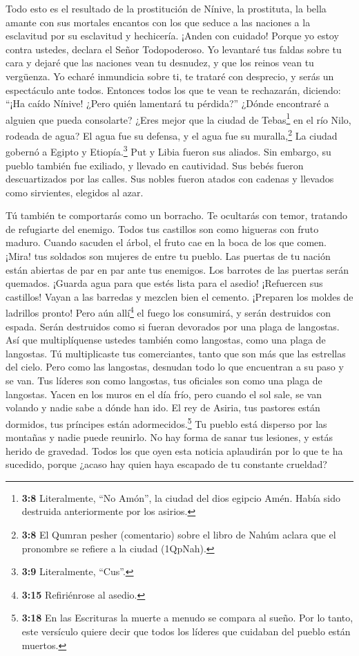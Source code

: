  Todo esto es el resultado de la prostitución de Nínive,
la prostituta, la bella amante con sus mortales encantos con los que
seduce a las naciones a la esclavitud por su esclavitud y hechicería.
 ¡Anden con cuidado! Porque yo estoy contra ustedes,
declara el Señor Todopoderoso. Yo levantaré tus faldas sobre tu cara y
dejaré que las naciones vean tu desnudez, y que los reinos vean tu
vergüenza.  Yo echaré inmundicia sobre ti, te trataré con
desprecio, y serás un espectáculo ante todos.  Entonces
todos los que te vean te rechazarán, diciendo: ``¡Ha caído Nínive! ¿Pero
quién lamentará tu pérdida?'' ¿Dónde encontraré a alguien que pueda
consolarte?  ¿Eres mejor que la ciudad de Tebas\footnote{\textbf{3:8}
  Literalmente, ``No Amón'', la ciudad del dios egipcio Amén. Había sido
  destruida anteriormente por los asirios.} en el río Nilo, rodeada de
agua? El agua fue su defensa, y el agua fue su muralla,\footnote{\textbf{3:8}
  El Qumran pesher (comentario) sobre el libro de Nahúm aclara que el
  pronombre se refiere a la ciudad (1QpNah).}  La ciudad
gobernó a Egipto y Etiopía.\footnote{\textbf{3:9} Literalmente, ``Cus''.}
Put y Libia fueron sus aliados.  Sin embargo, su pueblo
también fue exiliado, y llevado en cautividad. Sus bebés fueron
descuartizados por las calles. Sus nobles fueron atados con cadenas y
llevados como sirvientes, elegidos al azar.

 Tú también te comportarás como un borracho. Te ocultarás
con temor, tratando de refugiarte del enemigo.  Todos tus
castillos son como higueras con fruto maduro. Cuando sacuden el árbol,
el fruto cae en la boca de los que comen.  ¡Mira! tus
soldados son mujeres de entre tu pueblo. Las puertas de tu nación están
abiertas de par en par ante tus enemigos. Los barrotes de las puertas
serán quemados.  ¡Guarda agua para que estés lista para
el asedio! ¡Refuercen sus castillos! Vayan a las barredas y mezclen bien
el cemento. ¡Preparen los moldes de ladrillos pronto! 
Pero aún allí\footnote{\textbf{3:15} Refiriénrose al asedio.} el fuego
los consumirá, y serán destruidos con espada. Serán destruidos como si
fueran devorados por una plaga de langostas. Así que multiplíquense
ustedes también como langostas, como una plaga de langostas.
 Tú multiplicaste tus comerciantes, tanto que son más que
las estrellas del cielo. Pero como las langostas, desnudan todo lo que
encuentran a su paso y se van.  Tus líderes son como
langostas, tus oficiales son como una plaga de langostas. Yacen en los
muros en el día frío, pero cuando el sol sale, se van volando y nadie
sabe a dónde han ido.  El rey de Asiria, tus pastores
están dormidos, tus príncipes están adormecidos.\footnote{\textbf{3:18}
  En las Escrituras la muerte a menudo se compara al sueño. Por lo
  tanto, este versículo quiere decir que todos los líderes que cuidaban
  del pueblo están muertos.} Tu pueblo está disperso por las montañas y
nadie puede reunirlo.  No hay forma de sanar tus
lesiones, y estás herido de gravedad. Todos los que oyen esta noticia
aplaudirán por lo que te ha sucedido, porque ¿acaso hay quien haya
escapado de tu constante crueldad?
